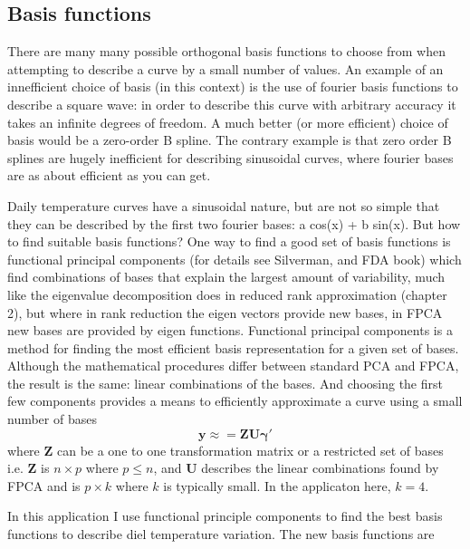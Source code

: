 



\subsection{Basis functions}

There are many many possible orthogonal basis functions to choose from when attempting to describe a curve by a small number of values.  An example of an innefficient choice of basis (in this context) is the use of fourier basis functions to describe a square wave: in order to describe this curve with arbitrary accuracy it takes an infinite degrees of freedom.  A much better (or more efficient) choice of basis would be a zero-order B spline.  The contrary example is that zero order B splines are hugely inefficient for describing sinusoidal curves, where fourier bases are as about efficient as you can get.

Daily temperature curves have a sinusoidal nature, but are not so simple that they can be described by the first two fourier bases: a cos(x) + b sin(x). But how to find suitable basis functions?  One way to find a good set of basis functions is functional principal components (for details see Silverman, and FDA book) which find  combinations of bases that explain the largest amount of variability, much like the eigenvalue decomposition does in reduced rank approximation (chapter 2), but where in rank reduction the eigen vectors provide new bases, in FPCA new bases are provided by eigen functions. Functional principal components is a method for finding the most efficient basis representation for a given set of bases.  Although the mathematical procedures differ between standard PCA and FPCA, the result is the same: linear combinations of the bases.  And choosing the first few components provides a means to efficiently approximate a curve using a small number of bases
\begin{equation}
   \bm{y} \approx = \bm{Z}\bm{U}\bm{\gamma}'
\end{equation}
where $\bm{Z}$ can be a one to one transformation matrix or a restricted set of bases i.e. $\bm{Z}$ is $n \times p$ where $p \leq n$, and $\bm{U}$ describes the linear combinations found by FPCA and is $p \times k$ where $k$ is typically small.  In the applicaton here, $k=4$.

In this application I use functional principle components to find the best basis functions to describe diel temperature variation.  The new basis functions are

